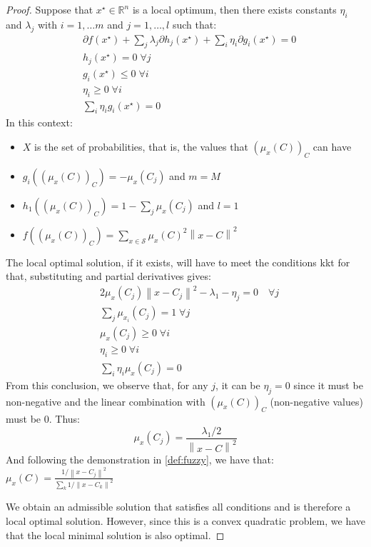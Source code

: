 \begin{remark}
\begin{toReview}
\begin{theorem}
\begin{proof}
		\noindent Suppose that $x^\star\in\mathbb{R}^n$ is a local optimum, then there exists constants $\eta_i$ and $\lambda_j$ with $i=1,\ldots m$ and $j=1,\ldots,l$ such that:
		\begin{align*}
			&\partial f(x^\star) + \sum_j \lambda_j \partial h_j(x^\star) + \sum_i \eta_i \partial g_i(x^\star) = 0\\
			&h_j(x^\star)=0 \; \forall j\\
			&g_i(x^\star)\leq0 \; \forall i\\
			&\eta_i \geq 0\;\forall i \\
			&\sum_i \eta_i g_i(x^\star) = 0
		\end{align*}
		\upshape
		In this context:
		\begin{itemize}
			\item $X$ is the set of probabilities, that is, the values that $\left(\mu_x(C)\right)_C$ can have
			\item $g_i(\left(\mu_x(C)\right)_C) = -\mu_x(C_j)$ and $m=M$
			\item $h_1(\left(\mu_x(C)\right)_C) = 1 - \sum_j \mu_{x}(C_j)$ and $l=1$
			\item $f(\left(\mu_x(C)\right)_C) = \sum_{x \in \mathcal{S}}\mu_x(C)^2\left\|x-C\right\|^2$
		\end{itemize}
		The local optimal solution, if it exists, will have to meet the conditions \gls{kkt} for that, substituting and partial derivatives gives:
		\begin{align*}
			&2\mu_x(C_j)\left\|x-C_j\right\|^2 - \lambda_1 - \eta_j = 0 \quad \forall j\\
			&\sum_j \mu_{x_i}(C_j)=1 \; \forall j\\
			&\mu_x(C_j)\geq0 \; \forall i\\
			&\eta_i \geq 0\;\forall i \\
			&\sum_i \eta_i \mu_x(C_j) = 0
		\end{align*}
		From this conclusion, we observe that, for any $j$, it can be $\eta_j=0$ since it must be non-negative and the linear combination with $\left(\mu_x(C)\right)_C$ (non-negative values) must be $0$. Thus:
		$$\mu_x(C_j) = \frac{\lambda_1/2}{\left\|x-C\right\|^2}$$
		And following the demonstration in \cref{def:fuzzy}, we have that:\\
		$\mu_x(C) = \frac{1/\left\|x-C_j\right\|^2}{\sum_k 1/\left\|x-C_k\right\|^2}$

		\bigskip \noindent We obtain an admissible solution that satisfies all conditions and is therefore a local optimal solution. However, since this is a convex quadratic problem, we have that the local minimal solution is also optimal.
	\end{proof}
	\end{theorem}
	\end{toReview}


\end{remark}
